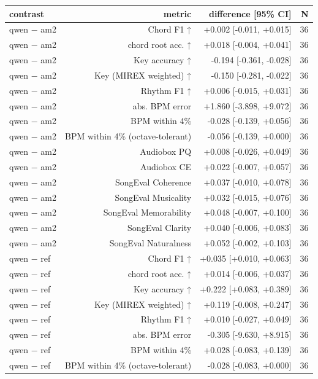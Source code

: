\begin{table}[t]
\centering
\small
\begin{tabular}{lrrr}
\toprule
contrast & metric & difference [95\% CI] & N \\
\midrule
qwen $-$ am2 & Chord F1 ↑ & +0.002 [-0.011, +0.015] & 36 \\
qwen $-$ am2 & chord root acc. ↑ & +0.018 [-0.004, +0.041] & 36 \\
qwen $-$ am2 & Key accuracy ↑ & -0.194 [-0.361, -0.028] & 36 \\
qwen $-$ am2 & Key (MIREX weighted) ↑ & -0.150 [-0.281, -0.022] & 36 \\
qwen $-$ am2 & Rhythm F1 ↑ & +0.006 [-0.015, +0.031] & 36 \\
qwen $-$ am2 & abs. BPM error & +1.860 [-3.898, +9.072] & 36 \\
qwen $-$ am2 & BPM within 4\% & -0.028 [-0.139, +0.056] & 36 \\
qwen $-$ am2 & BPM within 4\% (octave-tolerant) & -0.056 [-0.139, +0.000] & 36 \\
qwen $-$ am2 & Audiobox PQ & +0.008 [-0.026, +0.049] & 36 \\
qwen $-$ am2 & Audiobox CE & +0.022 [-0.007, +0.057] & 36 \\
qwen $-$ am2 & SongEval Coherence & +0.037 [-0.010, +0.078] & 36 \\
qwen $-$ am2 & SongEval Musicality & +0.032 [-0.015, +0.076] & 36 \\
qwen $-$ am2 & SongEval Memorability & +0.048 [-0.007, +0.100] & 36 \\
qwen $-$ am2 & SongEval Clarity & +0.040 [-0.006, +0.083] & 36 \\
qwen $-$ am2 & SongEval Naturalness & +0.052 [-0.002, +0.103] & 36 \\
qwen $-$ ref & Chord F1 ↑ & +0.035 [+0.010, +0.063] & 36 \\
qwen $-$ ref & chord root acc. ↑ & +0.014 [-0.006, +0.037] & 36 \\
qwen $-$ ref & Key accuracy ↑ & +0.222 [+0.083, +0.389] & 36 \\
qwen $-$ ref & Key (MIREX weighted) ↑ & +0.119 [-0.008, +0.247] & 36 \\
qwen $-$ ref & Rhythm F1 ↑ & +0.010 [-0.027, +0.049] & 36 \\
qwen $-$ ref & abs. BPM error & -0.305 [-9.630, +8.915] & 36 \\
qwen $-$ ref & BPM within 4\% & +0.028 [-0.083, +0.139] & 36 \\
qwen $-$ ref & BPM within 4\% (octave-tolerant) & -0.028 [-0.083, +0.000] & 36 \\

\end{tabular}
\end{table}
